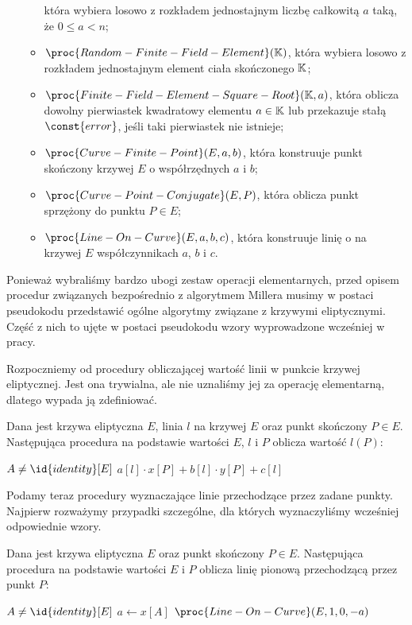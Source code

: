 \begin{remark}
\begin{itemize}
\begin{itemize}
która wybiera losowo z rozkładem jednostajnym
liczbę całkowitą $a$ taką, że $0 \leq a < n$;
\item $\proc{Random-Finite-Field-Element}(\K)$,
która wybiera losowo z rozkładem jednostajnym
element ciała skończonego $\mathbb{K}$;
\item $\proc{Finite-Field-Element-Square-Root}(\K, a)$,
która oblicza
dowolny pierwiastek kwadratowy elementu $a \in \mathbb{K}$
lub przekazuje stałą $\const{error}$, jeśli taki pierwiastek nie istnieje;
\item $\proc{Curve-Finite-Point}(E, a, b)$,
która konstruuje
punkt skończony krzywej $E$ o współrzędnych $a$ i $b$;
\item $\proc{Curve-Point-Conjugate}(E, P)$,
która oblicza
punkt sprzężony do punktu $P \in E$;
\item $\proc{Line-On-Curve}(E, a, b, c)$,
która konstruuje
linię o na krzywej $E$ współczynnikach $a$, $b$ i $c$.
\end{itemize}
\end{itemize}
\end{remark}

Ponieważ wybraliśmy bardzo ubogi zestaw operacji elementarnych,
przed opisem procedur związanych bezpośrednio z algorytmem Millera
musimy w postaci pseudokodu przedstawić
ogólne algorytmy związane z krzywymi eliptycznymi.
Część z nich to ujęte w postaci pseudokodu
wzory wyprowadzone wcześniej w pracy.

Rozpoczniemy od procedury obliczającej
wartość linii w punkcie krzywej eliptycznej.
Jest ona trywialna, ale nie uznaliśmy jej za operację elementarną,
dlatego wypada ją zdefiniować.

\begin{algorithm}
Dana jest krzywa eliptyczna $E$,
linia $l$ na krzywej $E$ oraz punkt skończony $P \in E$.
Następująca procedura
na podstawie wartości $E$, $l$ i $P$
oblicza
wartość $l(P)$:

\begin{codebox}
\li
    \Assert $A \neq \id{identity}[E]$
\li
    \Return $a[l]\cdot x[P] + b[l]\cdot y[P] + c[l]$
\end{codebox}
\end{algorithm}

Podamy teraz procedury wyznaczające linie przechodzące przez zadane punkty.
Najpierw rozważymy przypadki szczególne,
dla których wyznaczyliśmy wcześniej odpowiednie wzory.

\begin{algorithm}
Dana jest krzywa eliptyczna $E$
oraz punkt skończony $P \in E$.
Następująca procedura
na podstawie wartości $E$ i $P$
oblicza
linię pionową przechodzącą przez punkt $P$:

\begin{codebox}
\li
    \Assert $A \neq \id{identity}[E]$
\li
    $a \gets x[A]$
\li
    \Return $\proc{Line-On-Curve}(E, 1, 0, -a)$
\end{codebox}
\end{algorithm}

